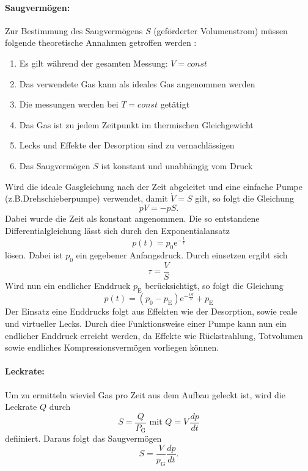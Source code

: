 \paragraph{Saugvermögen:}
 Zur Bestimmung des Saugvermögens $S$ (geförderter Volumenstrom) müssen folgende theoretische Annahmen getroffen werden \cite{anleitung}:
 \begin{enumerate}
   \item Es gilt während der gesamten Messung: $V = const$
   \item Das verwendete Gas kann als ideales Gas angenommen werden
   \item Die messungen werden bei $T = const$ getätigt
   \item Das Gas ist zu jedem Zeitpunkt im thermischen Gleichgewicht
   \item Lecks und Effekte der Desorption sind zu vernachlässigen
   \item Das Saugvermögen $S$ ist konstant und unabhängig vom Druck
 \end{enumerate}
Wird die ideale Gasgleichung nach der Zeit abgeleitet und eine einfache Pumpe (z.B.Drehschieberpumpe) verwendet, damit $\dot{V} = S$ gilt,
so folgt die Gleichung
\begin{equation}
  \dot{p}V = -pS.
\end{equation}
Dabei wurde die Zeit als konstant angenommen.
Die so entstandene Differentialgleichung lässt sich durch den Exponentialansatz
\begin{equation}
  p(t) = p_0 \text{e}^{-\frac{t}{\tau}}
\end{equation}
lösen. Dabei ist $p_0$ ein gegebener Anfangsdruck. Durch einsetzen ergibt sich
\begin{equation}
  \tau = \frac{V}{S}
\end{equation}
Wird nun ein endlicher Enddruck $p_\text{E}$ berücksichtigt, so folgt die Gleichung
\begin{equation}
  p(t) = (p_0 - p_\text{E})\text{e}^{-\frac{tS}{V}}+p_\text{E}
  \label{eqn:druck}
\end{equation}
Der Einsatz eine Enddrucks folgt aus Effekten wie der Desorption, sowie reale und virtueller Lecks. Durch diee Funktionsweise einer Pumpe kann nun ein
endlicher Enddruck erreicht werden, da Effekte wie Rückstrahlung, Totvolumen sowie endliches Kompressionsvermögen vorliegen können.

\paragraph{Leckrate:}
Um zu ermitteln wieviel Gas pro Zeit aus dem Aufbau geleckt ist, wird die Leckrate $Q$ durch
\begin{equation}
  S  = \frac{Q}{P_\text{G}} \text{ mit } Q = V\,\frac{dp}{dt}
\end{equation}
 defiiniert. Daraus folgt das Saugvermögen
 \begin{equation}
   S = \frac{V}{p_\text{G}}\frac{dp}{dt}.
   \label{eqn:Saug}
 \end{equation}

